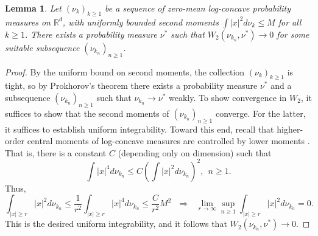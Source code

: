 \documentclass[10pt]{article}
\newtheorem{lemma}[theorem]{Lemma}
\begin{document}
\begin{lemma}
Let $(\nu_k)_{k\geq 1}$ be a sequence of zero-mean log-concave probability measures on $\mathbb{R}^d$, with uniformly bounded second moments $\int |x|^2 d\nu_k \leq M$ for all $k\geq 1$.  There exists a probability measure $\nu^*$ such that $W_2(\nu_{k_n}, \nu^*)\to 0$ for some suitable subsequence $(\nu_{k_n})_{n\geq 1}$. 
\end{lemma}
\begin{proof}
By the uniform bound on second moments, the collection $(\nu_k)_{k\geq 1}$ is tight, so by Prokhorov's theorem there exists a probability measure $\nu^*$ and a subsequence $(\nu_{k_n})_{n\geq 1}$ such that $\nu_{k_n} \to \nu^*$ weakly.  To show convergence in $W_2$, it suffices to show that the second moments of $(\nu_{k_n})_{n\geq 1}$ converge.  For the latter, it suffices to establish uniform integrability.  Toward this end, recall that higher-order central moments of log-concave measures are controlled by lower moments \cite{Bor1975}.  That is, there is a constant $C$ (depending only on dimension) such that 
$$
\int |x|^4 d\nu_{k_n} \leq C \left( \int |x|^2 d\nu_{k_n}  \right)^2, ~~n\geq 1.
$$
Thus, 
$$
\int_{|x|\geq r} |x|^2 d\nu_{k_n} \leq \frac{1}{r^2} \int_{|x|\geq r} |x|^4 d\nu_{k_n} \leq \frac{C}{r^2}  M^2~~~\Rightarrow~~~\lim_{r\to \infty} \sup_{n\geq 1} \int_{|x|\geq r} |x|^2 d\nu_{k_n} =0.
$$
This is the desired uniform integrability, and it follows that $W_2(\nu_{k_n}, \nu^*)\to 0$.
\end{proof}
\end{document}
